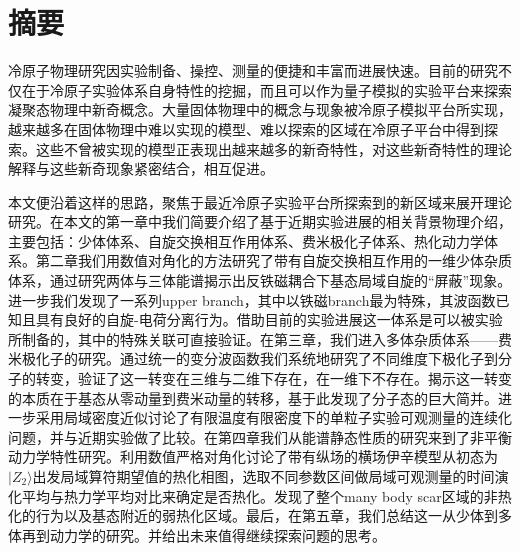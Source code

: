 \maketitle%
\MAKETITLE%
\makedeclaration%
\intobmk\chapter*{摘\quad 要}%
\setcounter{page}{1}%

冷原子物理研究因实验制备、操控、测量的便捷和丰富而进展快速。目前的研究不仅在于冷原子实验体系自身特性的挖掘，而且可以作为量子模拟的实验平台来探索凝聚态物理中新奇概念。大量固体物理中的概念与现象被冷原子模拟平台所实现，越来越多在固体物理中难以实现的模型、难以探索的区域在冷原子平台中得到探索。这些不曾被实现的模型正表现出越来越多的新奇特性，对这些新奇特性的理论解释与这些新奇现象紧密结合，相互促进。

本文便沿着这样的思路，聚焦于最近冷原子实验平台所探索到的新区域来展开理论研究。在本文的第一章中我们简要介绍了基于近期实验进展的相关背景物理介绍，主要包括：少体体系、自旋交换相互作用体系、费米极化子体系、热化动力学体系。第二章我们用数值对角化的方法研究了带有自旋交换相互作用的一维少体杂质体系，通过研究两体与三体能谱揭示出反铁磁耦合下基态局域自旋的“屏蔽”现象。进一步我们发现了一系列upper branch，其中以铁磁branch最为特殊，其波函数已知且具有良好的自旋-电荷分离行为。借助目前的实验进展这一体系是可以被实验所制备的，其中的特殊关联可直接验证。在第三章，我们进入多体杂质体系——费米极化子的研究。通过统一的变分波函数我们系统地研究了不同维度下极化子到分子的转变，验证了这一转变在三维与二维下存在，在一维下不存在。揭示这一转变的本质在于基态从零动量到费米动量的转移，基于此发现了分子态的巨大简并。进一步采用局域密度近似讨论了有限温度有限密度下的单粒子实验可观测量的连续化问题，并与近期实验做了比较。在第四章我们从能谱静态性质的研究来到了非平衡动力学特性研究。利用数值严格对角化讨论了带有纵场的横场伊辛模型从初态为$|Z_2\rangle$出发局域算符期望值的热化相图，选取不同参数区间做局域可观测量的时间演化平均与热力学平均对比来确定是否热化。发现了整个many body scar区域的非热化的行为以及基态附近的弱热化区域。最后，在第五章，我们总结这一从少体到多体再到动力学的研究。并给出未来值得继续探索问题的思考。



